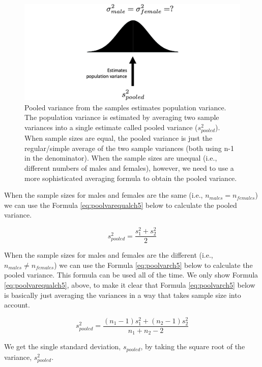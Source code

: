 \documentclass[
]{krantz}
\begin{document}
\newpage

\begin{figure}
\includegraphics[width=0.8\linewidth]{ch_samples/images/pool3} \caption[Pooled variance estimates population variance]{Pooled variance from the samples estimates population variance. The population variance is estimated by averaging two sample variances into a single estimate called pooled variance ($s_{pooled}^2$). When sample sizes are equal, the pooled variance is just the regular/simple average of the two sample variances (both using n-1 in the denominator). When the sample sizes are unequal (i.e., different numbers of males and females), however, we need to use a more sophisticated averaging formula to obtain the pooled variance.}\label{fig:pool3}
\end{figure}

When the sample sizes for males and females are the same (i.e., \(n_{males} =n_{females}\)) we can use the Formula \eqref{eq:poolvarequalch5} below to calculate the pooled variance.

\begin{equation} 
s_{pooled}^2  = \frac{s_{1}^2 + s_{2}^2}{2} 
      \label{eq:poolvarequalch5}
\end{equation}

When the sample sizes for males and females are the different (i.e., \(n_{males} \ne n_{females}\)) we can use the Formula \eqref{eq:poolvarch5} below to calculate the pooled variance. This formula can be used all of the time. We only show Formula \eqref{eq:poolvarequalch5}, above, to make it clear that Formula \eqref{eq:poolvarch5} below is basically just averaging the variances in a way that takes sample size into account.

\begin{equation} 
s_{pooled}^2  = \frac{(n_1 -1)s_1^2 + (n_2 -1)s_2^2}{n_1 + n_2-2}
      \label{eq:poolvarch5}
\end{equation}

We get the single standard deviation, \(s_{pooled}\), by taking the square root of the variance, \(s_{pooled}^2\).
\end{document}
